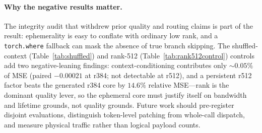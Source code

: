 \paragraph{Why the negative results matter.}
The integrity audit that withdrew prior quality and routing claims is
part of the result: ephemerality is easy to conflate with ordinary low
rank, and a \texttt{torch.where} fallback can mask the absence of true
branch skipping.  The shuffled-context (Table~\ref{tab:shuffled}) and
rank-512 (Table~\ref{tab:rank512control}) controls add two
negative-leaning findings: context-conditioning contributes only
${\sim}0.05\%$ of MSE (paired $-0.00021$ at r384; not detectable at
r512), and a persistent r512 factor
beats the generated r384 core by $14.6\%$ relative MSE---rank is the
dominant quality lever, so the ephemeral core must justify itself on
bandwidth and lifetime grounds, not quality grounds.  Future work should
pre-register disjoint evaluations, distinguish token-level patching from
whole-call dispatch, and measure physical traffic rather than logical
payload counts.
